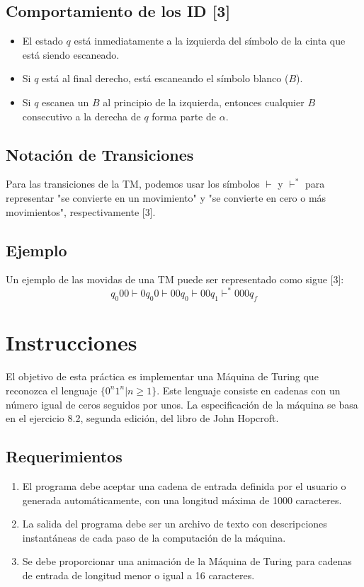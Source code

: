 \documentclass[11pt]{article} %
\begin{document}
	\subsection{Comportamiento de los ID [3]}
	\begin{itemize}
		\item El estado \(q\) está inmediatamente a la izquierda del símbolo de la cinta que está siendo escaneado.
		\item Si \(q\) está al final derecho, está escaneando el símbolo blanco (\(B\)).
		\item Si \(q\) escanea un \(B\) al principio de la izquierda, entonces cualquier \(B\) consecutivo a la derecha de \(q\) forma parte de \(\alpha\).
	\end{itemize}
	
	\subsection*{Notación de Transiciones}
	Para las transiciones de la TM, podemos usar los símbolos \(\vdash\) y \(\vdash^*\) para representar "se convierte en un movimiento" y "se convierte en cero o más movimientos", respectivamente [3].
	
	\subsection*{Ejemplo}
	Un ejemplo de las movidas de una TM puede ser representado como sigue [3]:
	\[ q_0 00 \vdash 0q_0 0 \vdash 00q_0 \vdash 00q_1 \vdash^* 000q_f \]
	
	
	
	\section{Instrucciones}
	
	El objetivo de esta práctica es implementar una Máquina de Turing que reconozca el lenguaje \(\{0^n1^n | n \geq 1\}\). Este lenguaje consiste en cadenas con un número igual de ceros seguidos por unos. La especificación de la máquina se basa en el ejercicio 8.2, segunda edición, del libro de John Hopcroft.
	
	\subsection*{Requerimientos}
	\begin{enumerate}
		\item El programa debe aceptar una cadena de entrada definida por el usuario o generada automáticamente, con una longitud máxima de 1000 caracteres.
		\item La salida del programa debe ser un archivo de texto con descripciones instantáneas de cada paso de la computación de la máquina.
		\item Se debe proporcionar una animación de la Máquina de Turing para cadenas de entrada de longitud menor o igual a 16 caracteres.
	\end{enumerate}
	
\end{document}
